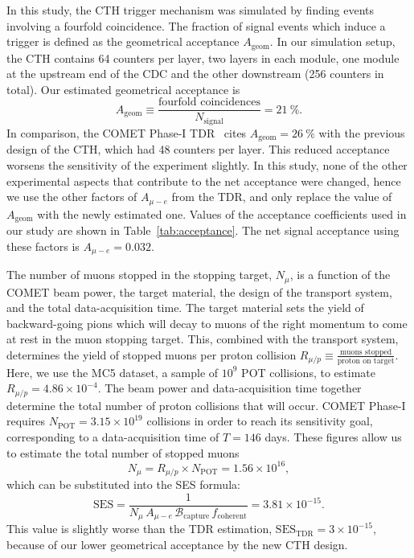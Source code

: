 
In this study, the CTH trigger mechanism was simulated by finding events
involving a fourfold coincidence. The fraction of signal events which induce a
trigger is defined as the geometrical acceptance $A_\mathrm{geom}$. In our
simulation setup, the CTH contains 64 counters per layer, two layers
in each module, one module at the upstream end of the CDC and the other
downstream (256 counters in total). Our estimated geometrical acceptance is
$$
A_\mathrm{geom} \equiv \frac{\text{fourfold coincidences}}{N_\mathrm{signal}} = \SI{21}{\percent}.
$$
In comparison, the COMET Phase-I TDR~\cite{the_comet_collaboration_comet_2020}
cites $A_\mathrm{geom} = \SI{26}{\percent}$ with the previous design of the CTH,
which had 48 counters per layer. This reduced acceptance worsens the sensitivity
of the experiment slightly. In this study, none of the other experimental
aspects that contribute to the net acceptance were changed, hence we use the
other factors of $A_{\mu-e}$ from the TDR, and only replace the value of
$A_\mathrm{geom}$ with the newly estimated one. Values of the acceptance
coefficients used in our study are shown in Table~\ref{tab:acceptance}. The net
signal acceptance using these factors is $A_{\mu-e} = 0.032$.

The number of muons stopped in the stopping target, $N_\mu$, is a function of
the COMET beam power, the target material, the design of the
transport system, and the total data-acquisition time. 
The target material sets the yield of
backward-going pions which will decay to muons of the right momentum to come at
rest in the muon stopping target. This, combined with the transport system,
determines the yield of stopped muons per proton collision $R_{\mu/p} \equiv
\frac{\text{muons stopped}}{\text{proton on target}}$. Here, we use the
MC5 dataset, a sample of $10^9$ POT collisions, to estimate $R_{\mu/p}=4.86
\times 10^{-4}$.
The beam power and data-acquisition time together determine the total number of proton
collisions that will occur. COMET Phase-I requires $N_\mathrm{POT} = 3.15 \times
10^{19}$ collisions in order to reach its sensitivity goal, corresponding to a
data-acquisition time of $T=146$ days.
These figures allow us to estimate the total number of stopped muons
$$N_\mu = R_{\mu/p} \times N_\mathrm{POT} = 1.56\times 10^{16},$$
which can be substituted into the SES formula:
\begin{equation}\label{eq:my_ses}
\mathrm{SES}
=\frac{1}{N_\mu\,A_{\mu-e}\,\mathcal{B}_\mathrm{capture}\,f_\mathrm{coherent}}
= 3.81\times10^{-15}.
\end{equation}
This value is slightly worse than the TDR estimation,
$\mathrm{SES}_\mathrm{TDR}=3\times 10^{-15}$, because of our lower geometrical
acceptance by the new CTH design.

